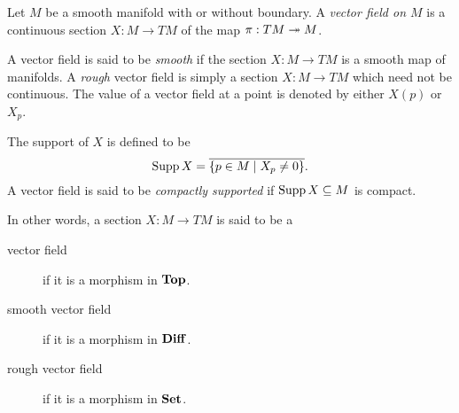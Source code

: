 \begin{definition}
    Let $M$ be a smooth manifold with or without boundary. A \emph{vector field on $M$} is a continuous section $X:M\to TM$ of the map $\pi: TM\twoheadrightarrow M$. 

    A vector field is said to be \emph{smooth} if the section $X: M\to TM$ is a smooth map of manifolds. A \emph{rough} vector field is simply a section $X: M\to TM$ which need not be continuous. The value of a vector field at a point is denoted by either $X(p)$ or $X_p$.

    The support of $X$ is defined to be 
    \begin{equation*}
        \operatorname{Supp} X = \overline{\{p\in M\mid X_p\ne 0\}}.
    \end{equation*}
    A vector field is said to be \emph{compactly supported} if $\operatorname{Supp} X\subseteq M$ is compact.
\end{definition}

\begin{mdframed}
    In other words, a section $X: M\to TM$ is said to be a 
    \begin{description}
        \item[vector field] if it is a morphism in $\mathbf{Top}$.
        \item[smooth vector field] if it is a morphism in $\mathbf{Diff}$.
        \item[rough vector field] if it is a morphism in $\mathbf{Set}$.
    \end{description}
\end{mdframed}
